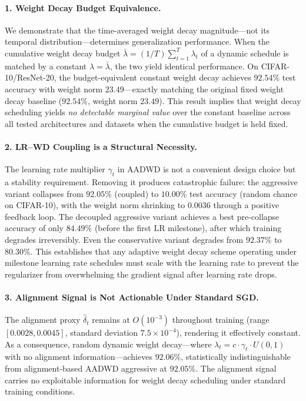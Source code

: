 \documentclass{article}
\begin{document}
\paragraph{1. Weight Decay Budget Equivalence.}
We demonstrate that the time-averaged weight decay magnitude---not its temporal
distribution---determines generalization performance.
When the cumulative weight decay budget
$\bar{\lambda} = (1/T)\sum_{t=1}^{T} \lambda_t$ of a dynamic schedule is matched by
a constant $\lambda = \bar{\lambda}$, the two yield identical performance.
On CIFAR-10/ResNet-20, the budget-equivalent constant weight decay achieves $92.54\%$
test accuracy with weight norm $23.49$---exactly matching the original fixed weight
decay baseline ($92.54\%$, weight norm $23.49$).
This result implies that weight decay scheduling yields \emph{no detectable marginal
value} over the constant baseline across all tested architectures and datasets when
the cumulative budget is held fixed.

\paragraph{2. LR--WD Coupling is a Structural Necessity.}
The learning rate multiplier $\gamma_t$ in AADWD is not a convenient design choice
but a stability requirement.
Removing it produces catastrophic failure: the aggressive variant collapses from
$92.05\%$ (coupled) to $10.00\%$ test accuracy (random chance on CIFAR-10), with the
weight norm shrinking to $0.0036$ through a positive feedback loop.
The decoupled aggressive variant achieves a best pre-collapse accuracy of only
$84.49\%$ (before the first LR milestone), after which training degrades
irreversibly.
Even the conservative variant degrades from $92.37\%$ to $80.30\%$.
This establishes that any adaptive weight decay scheme operating under milestone
learning rate schedules must scale with the learning rate to prevent the regularizer
from overwhelming the gradient signal after learning rate drops.

\paragraph{3. Alignment Signal is Not Actionable Under Standard SGD.}
The alignment proxy $\hat{\delta}_t$ remains at $O(10^{-3})$ throughout training
(range $[0.0028, 0.0045]$, standard deviation $7.5 \times 10^{-4}$), rendering it
effectively constant.
As a consequence, random dynamic weight decay---where
$\lambda_t = c \cdot \gamma_t \cdot U(0,1)$ with no alignment information---achieves
$92.06\%$, statistically indistinguishable from alignment-based AADWD aggressive at
$92.05\%$.
The alignment signal carries no exploitable information for weight decay scheduling
under standard training conditions.
\end{document}
